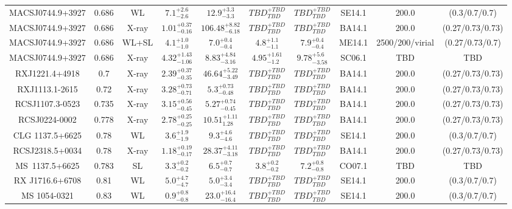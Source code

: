 \begin{table}
\begin{tabular}{cccccccccc}
MACSJ0744.9+3927 & 0.686 & WL & ${7.1}^{+2.6}_{-2.6}$ & ${12.9}^{+3.3}_{-3.3}$ & ${TBD}^{+TBD}_{TBD}$ & ${TBD}^{+TBD}_{TBD}$ & SE14.1 & 200.0 & (0.3/0.7/0.7) \\
MACSJ0744.9+3927 & 0.686 & X-ray & ${1.01}^{+0.37}_{-0.16}$ & ${106.48}^{+8.82}_{-6.18}$ & ${TBD}^{+TBD}_{TBD}$ & ${TBD}^{+TBD}_{TBD}$ & BA14.1 & 200.0 & (0.27/0.73/0.73) \\
MACSJ0744.9+3927 & 0.686 & WL+SL & ${4.1}^{+1.0}_{-1.0}$ & ${7.0}^{+0.4}_{-0.4}$ & ${4.8}^{+1.1}_{-1.1}$ & ${7.9}^{+0.4}_{-0.4}$ & ME14.1 & 2500/200/virial & (0.27/0.73/0.7) \\
MACSJ0744.9+3927 & 0.686 & X-ray & ${4.32}^{+1.43}_{-1.06}$ & ${8.83}^{+4.84}_{-3.16}$ & ${4.95}^{+1.61}_{-1.2}$ & ${9.78}^{+5.6}_{-3.58}$ & SC06.1 & TBD & TBD \\
RXJ1221.4+4918 & 0.7 & X-ray & ${2.39}^{+0.37}_{-0.35}$ & ${46.64}^{+5.22}_{-3.49}$ & ${TBD}^{+TBD}_{TBD}$ & ${TBD}^{+TBD}_{TBD}$ & BA14.1 & 200.0 & (0.27/0.73/0.73) \\
RXJ1113.1-2615 & 0.72 & X-ray & ${3.28}^{+0.73}_{-0.71}$ & ${5.3}^{+0.73}_{-0.48}$ & ${TBD}^{+TBD}_{TBD}$ & ${TBD}^{+TBD}_{TBD}$ & BA14.1 & 200.0 & (0.27/0.73/0.73) \\
RCSJ1107.3-0523 & 0.735 & X-ray & ${3.15}^{+0.56}_{-0.45}$ & ${5.27}^{+0.74}_{-0.45}$ & ${TBD}^{+TBD}_{TBD}$ & ${TBD}^{+TBD}_{TBD}$ & BA14.1 & 200.0 & (0.27/0.73/0.73) \\
RCSJ0224-0002 & 0.778 & X-ray & ${2.78}^{+0.25}_{-0.25}$ & ${10.51}^{+1.11}_{1.28}$ & ${TBD}^{+TBD}_{TBD}$ & ${TBD}^{+TBD}_{TBD}$ & BA14.1 & 200.0 & (0.27/0.73/0.73) \\
CLG 1137.5+6625 & 0.78 & WL & ${3.6}^{+1.9}_{-1.9}$ & ${9.3}^{+4.6}_{-4.6}$ & ${TBD}^{+TBD}_{TBD}$ & ${TBD}^{+TBD}_{TBD}$ & SE14.1 & 200.0 & (0.3/0.7/0.7) \\
RCSJ2318.5+0034 & 0.78 & X-ray & ${1.18}^{+0.19}_{-0.17}$ & ${28.37}^{+4.11}_{-3.18}$ & ${TBD}^{+TBD}_{TBD}$ & ${TBD}^{+TBD}_{TBD}$ & BA14.1 & 200.0 & (0.27/0.73/0.73) \\
MS~1137.5+6625 & 0.783 & SL & ${3.3}^{+0.2}_{-0.2}$ & ${6.5}^{+0.7}_{-0.7}$ & ${3.8}^{+0.2}_{-0.2}$ & ${7.2}^{+0.8}_{-0.8}$ & CO07.1 & TBD & TBD \\
RX J1716.6+6708 & 0.81 & WL & ${5.0}^{+4.7}_{-4.7}$ & ${5.0}^{+3.4}_{-3.4}$ & ${TBD}^{+TBD}_{TBD}$ & ${TBD}^{+TBD}_{TBD}$ & SE14.1 & 200.0 & (0.3/0.7/0.7) \\
MS 1054-0321 & 0.83 & WL & ${0.9}^{+0.8}_{-0.8}$ & ${23.0}^{+16.4}_{-16.4}$ & ${TBD}^{+TBD}_{TBD}$ & ${TBD}^{+TBD}_{TBD}$ & SE14.1 & 200.0 & (0.3/0.7/0.7) \\

\end{tabular}
\end{table}
